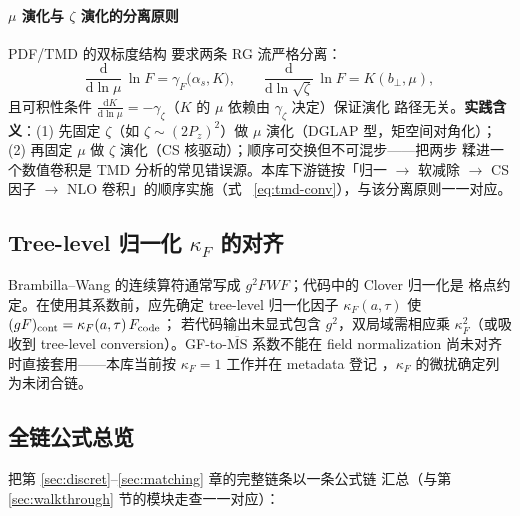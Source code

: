 \documentclass[11pt,a4paper]{ctexart}
\newcommand{\MSbarM}{\overline{\text{MS}}}
\newcommand{\bperp}{b_{\perp}}
\begin{document}
\paragraph{$\mu$ 演化与 $\zeta$ 演化的分离原则}PDF/TMD 的双标度结构
要求两条 RG 流严格分离：
\begin{equation}
\frac{\mathrm{d}}{\mathrm{d}\ln\mu}\,\ln F = \gamma_F\bigl(\alpha_s,
K\bigr), \qquad
\frac{\mathrm{d}}{\mathrm{d}\ln\sqrt\zeta}\,\ln F = K(\bperp,\mu),
\end{equation}
且可积性条件 $\frac{\mathrm{d}K}{\mathrm{d}\ln\mu}
=-\gamma_\zeta$（$K$ 的 $\mu$ 依赖由 $\gamma_\zeta$ 决定）保证演化
路径无关。\textbf{实践含义}：(1) 先固定 $\zeta$（如 $\zeta\sim
(2P_z)^2$）做 $\mu$ 演化（DGLAP 型，矩空间对角化）；(2) 再固定
$\mu$ 做 $\zeta$ 演化（CS 核驱动）；顺序可交换但不可混步——把两步
糅进一个数值卷积是 TMD 分析的常见错误源。本库下游链按「归一 $\to$
软减除 $\to$ CS 因子 $\to$ NLO 卷积」的顺序实施（式
~\eqref{eq:tmd-conv}），与该分离原则一一对应。

\subsection{Tree-level 归一化 $\kappa_F$ 的对齐}

Brambilla--Wang 的连续算符通常写成 $g^2FWF$；代码中的 Clover 归一化是
格点约定。在使用其系数前，应先确定 tree-level 归一化因子
$\kappa_F(a,\tau)$ 使 $(gF)_{\rm cont}=\kappa_F(a,\tau)\,F_{\rm code}$；
若代码输出未显式包含 $g^2$，双局域需相应乘 $\kappa_F^2$（或吸收到
tree-level conversion）。GF-to-$\MSbarM$ 系数不能在 field normalization
尚未对齐时直接套用——本库当前按 $\kappa_F=1$ 工作并在 metadata 登记
，$\kappa_F$ 的微扰确定列为未闭合链。

\subsection{全链公式总览}
\label{sec:formula-chain}

把第 \ref{sec:discret}--\ref{sec:matching} 章的完整链条以一条公式链
汇总（与第 \ref{sec:walkthrough} 节的模块走查一一对应）：
\end{document}
